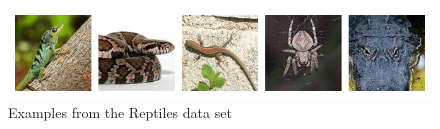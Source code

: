 \begin{figure}[H]
\centering
\includegraphics[width=\textwidth]{figures/reptiles.png}
\caption{Examples from the Reptiles data set}
\label{fig:reptiles}
\end{figure}




